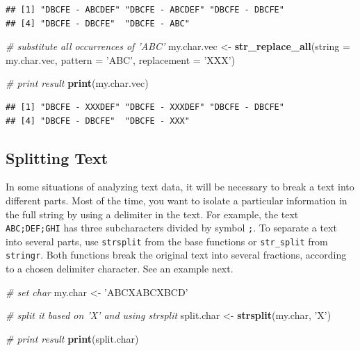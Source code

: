 \documentclass[11pt,]{book}
\newenvironment{Shaded}{\begin{snugshade}}{\end{snugshade}}
\newcommand{\KeywordTok}[1]{\textcolor[rgb]{0.27,0.27,0.27}{\textbf{#1}}}
\newcommand{\DataTypeTok}[1]{\textcolor[rgb]{0.27,0.27,0.27}{#1}}
\newcommand{\StringTok}[1]{\textcolor[rgb]{0.5,0.5,0.5}{#1}}
\newcommand{\CommentTok}[1]{\textcolor[rgb]{0.56,0.35,0.01}{\textit{#1}}}
\newcommand{\NormalTok}[1]{#1}
\begin{document}
\begin{verbatim}
## [1] "DBCFE - ABCDEF" "DBCFE - ABCDEF" "DBCFE - DBCFE" 
## [4] "DBCFE - DBCFE"  "DBCFE - ABC"
\end{verbatim}

\begin{Shaded}
\begin{Highlighting}[]
\CommentTok{# substitute all occurrences of 'ABC'}
\NormalTok{my.char.vec <-}\StringTok{ }\KeywordTok{str_replace_all}\NormalTok{(}\DataTypeTok{string =}\NormalTok{ my.char.vec, }
                               \DataTypeTok{pattern =} \StringTok{'ABC'}\NormalTok{, }
                               \DataTypeTok{replacement =} \StringTok{'XXX'}\NormalTok{)}

\CommentTok{# print result}
\KeywordTok{print}\NormalTok{(my.char.vec)}
\end{Highlighting}
\end{Shaded}

\begin{verbatim}
## [1] "DBCFE - XXXDEF" "DBCFE - XXXDEF" "DBCFE - DBCFE" 
## [4] "DBCFE - DBCFE"  "DBCFE - XXX"
\end{verbatim}

\subsection{Splitting Text}\label{splitting-text}

In some situations of analyzing text data, it will be necessary to break
a text into different parts. Most of the time, you want to isolate a
particular information in the full string by using a delimiter in the
text. For example, the text
\texttt{\textquotesingle{}ABC;DEF;GHI\textquotesingle{}} has three
subcharacters divided by symbol \texttt{;}. To separate a text into
several parts, use \texttt{strsplit} from the base functions or
\texttt{str\_split} from \texttt{stringr}. Both functions break the
original text into several fractions, according to a chosen delimiter
character. See an example next. 

\begin{Shaded}
\begin{Highlighting}[]
\CommentTok{# set char}
\NormalTok{my.char <-}\StringTok{ 'ABCXABCXBCD'}

\CommentTok{# split it based on 'X' and using strsplit}
\NormalTok{split.char <-}\StringTok{ }\KeywordTok{strsplit}\NormalTok{(my.char, }\StringTok{'X'}\NormalTok{)}

\CommentTok{# print result}
\KeywordTok{print}\NormalTok{(split.char)}
\end{Highlighting}
\end{Shaded}
\end{document}
